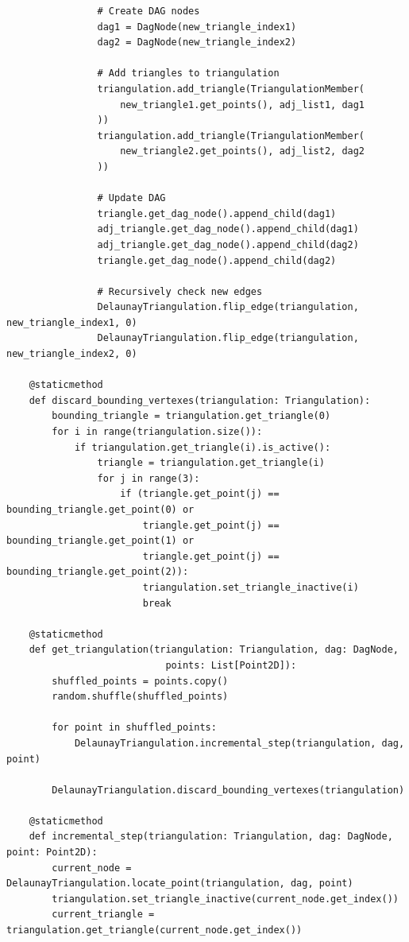 \documentclass{article}
\begin{document}
\begin{lstlisting}
                # Create DAG nodes
                dag1 = DagNode(new_triangle_index1)
                dag2 = DagNode(new_triangle_index2)
                
                # Add triangles to triangulation
                triangulation.add_triangle(TriangulationMember(
                    new_triangle1.get_points(), adj_list1, dag1
                ))
                triangulation.add_triangle(TriangulationMember(
                    new_triangle2.get_points(), adj_list2, dag2
                ))
                
                # Update DAG
                triangle.get_dag_node().append_child(dag1)
                adj_triangle.get_dag_node().append_child(dag1)
                adj_triangle.get_dag_node().append_child(dag2)
                triangle.get_dag_node().append_child(dag2)
                
                # Recursively check new edges
                DelaunayTriangulation.flip_edge(triangulation, new_triangle_index1, 0)
                DelaunayTriangulation.flip_edge(triangulation, new_triangle_index2, 0)

    @staticmethod
    def discard_bounding_vertexes(triangulation: Triangulation):
        bounding_triangle = triangulation.get_triangle(0)
        for i in range(triangulation.size()):
            if triangulation.get_triangle(i).is_active():
                triangle = triangulation.get_triangle(i)
                for j in range(3):
                    if (triangle.get_point(j) == bounding_triangle.get_point(0) or 
                        triangle.get_point(j) == bounding_triangle.get_point(1) or 
                        triangle.get_point(j) == bounding_triangle.get_point(2)):
                        triangulation.set_triangle_inactive(i)
                        break

    @staticmethod
    def get_triangulation(triangulation: Triangulation, dag: DagNode, 
                            points: List[Point2D]):
        shuffled_points = points.copy()
        random.shuffle(shuffled_points)
        
        for point in shuffled_points:
            DelaunayTriangulation.incremental_step(triangulation, dag, point)
        
        DelaunayTriangulation.discard_bounding_vertexes(triangulation)

    @staticmethod
    def incremental_step(triangulation: Triangulation, dag: DagNode, point: Point2D):
        current_node = DelaunayTriangulation.locate_point(triangulation, dag, point)
        triangulation.set_triangle_inactive(current_node.get_index())
        current_triangle = triangulation.get_triangle(current_node.get_index())
        

\end{lstlisting}
\end{document}
